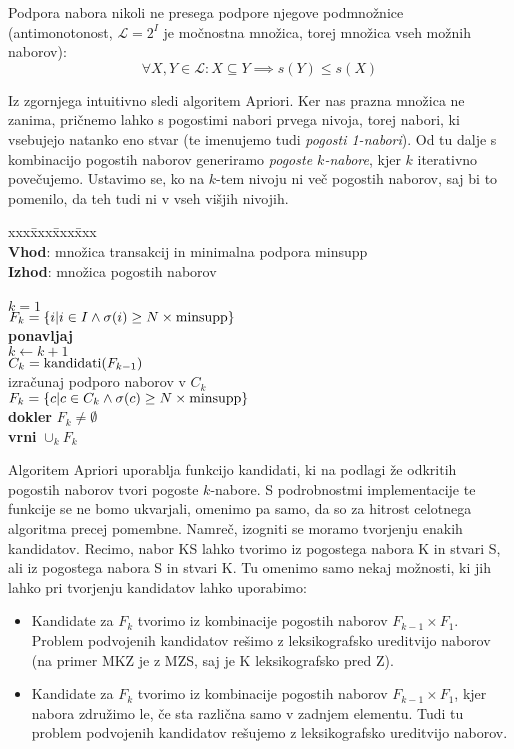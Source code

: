 \begin{teorem}
  Podpora nabora nikoli ne presega podpore njegove podmnožnice (antimonotonost, ${\mathcal L}=2^I$ je močnostna množica, torej množica vseh možnih naborov):
  $$ \forall X,Y\in {\mathcal L}: X\subseteq Y\implies s(Y)\leq s(X) $$
\end{teorem}

Iz zgornjega intuitivno sledi algoritem Apriori. Ker nas prazna množica ne zanima, pričnemo lahko s pogostimi nabori prvega nivoja, torej nabori, ki vsebujejo natanko eno stvar (te imenujemo tudi {\em pogosti 1-nabori}). Od tu dalje s kombinacijo pogostih naborov generiramo {\em pogoste $k$-nabore}, kjer $k$ iterativno povečujemo. Ustavimo se, ko na $k$-tem nivoju ni več pogostih naborov, saj bi to pomenilo, da teh tudi ni v vseh višjih nivojih.

\begin{tabbing}
xxx\=xxx\=xxx\=xxx \kill\\
{\bf Vhod}: množica transakcij in minimalna podpora minsupp \\
{\bf Izhod}: množica pogostih naborov \\
\\
$k=1$ \\
$F_k=\{i|i\in I\land\sigma(i)\geq N\times{\rm minsupp}\}$ \\
{\bf ponavljaj} \\
\> $k\leftarrow k+1$ \\
\> $C_k={\rm kandidati}(F_{k-1})$ \\
\> izračunaj podporo naborov v $C_k$ \\
\> $F_k=\{c | c\in C_k\land\sigma(c)\geq N\times{\rm minsupp}\}$ \\
{\bf dokler} $F_k\neq\emptyset$ \\
{\bf vrni} $\cup_k F_k$ \\
\end{tabbing}

Algoritem Apriori uporablja funkcijo kandidati, ki na podlagi že odkritih pogostih naborov tvori pogoste $k$-nabore. S podrobnostmi implementacije te funkcije se ne bomo ukvarjali, omenimo pa samo, da so za hitrost celotnega algoritma precej pomembne. Namreč, izogniti se moramo tvorjenju enakih kandidatov. Recimo, nabor KS lahko tvorimo iz pogostega nabora K in stvari S, ali iz pogostega nabora S in stvari K. Tu omenimo samo nekaj možnosti, ki jih lahko pri tvorjenju kandidatov lahko uporabimo:
\begin{itemize}
\item Kandidate za $F_k$ tvorimo iz kombinacije pogostih naborov $F_{k-1}\times F_1$. Problem podvojenih kandidatov rešimo z leksikografsko ureditvijo naborov (na primer MKZ je z MZS, saj je K leksikografsko pred Z).
\item Kandidate za $F_k$ tvorimo iz kombinacije pogostih naborov $F_{k-1}\times F_1$, kjer nabora združimo le, če sta različna samo v zadnjem elementu. Tudi tu problem podvojenih kandidatov rešujemo z leksikografsko ureditvijo naborov.
\end{itemize}

